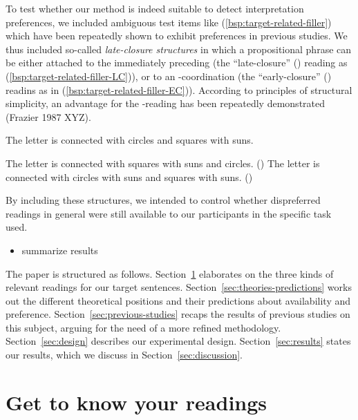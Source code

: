 \documentclass[fleqn,reqno,10pt,draft]{article}
\newcommand{\lc}{\acro{lc}}
\newcommand{\ec}{\acro{ec}}
\newcommand{\LC}{\lc}
\newcommand{\EC}{\ec}
\begin{document}
 
To test whether our method is indeed suitable to detect interpretation
preferences, we included ambiguous test items like
(\ref{bsp:target-related-filler}) which have been repeatedly shown to
exhibit preferences in previous studies. We thus included so-called
\emph{late-closure structures} in which a propositional phrase can be
either attached to the immediately preceding  (the
``late-closure'' (\LC) reading as
(\ref{bsp:target-related-filler-LC})), or to an -coordination
(the ``early-closure'' (\EC) readins as in
(\ref{bsp:target-related-filler-EC})). According to principles of
structural simplicity, an advantage for the \LC-reading has been
repeatedly demonstrated (Frazier 1987 XYZ).
\begin{exe}
\ex \label{bsp:target-related-filler} The letter is connected with circles and squares with
  suns.
  \begin{xlist}
  \ex \label{bsp:target-related-filler-LC} The letter is connected
    with squares with suns and circles. \hfill (\LC)
  \ex \label{bsp:target-related-filler-EC} The letter is connected
    with circles with suns and squares with suns. \hfill (\EC)
  \end{xlist}
\end{exe}
By including these structures, we intended to control whether
dispreferred readings in general were still available to our
participants in the specific task used.

\begin{itemize}
\item summarize results
\end{itemize}

The paper is structured as follows. Section~\ref{sec:get-know-your}
elaborates on the three kinds of relevant readings for our target
sentences. Section~\ref{sec:theories-predictions} works out the
different theoretical positions and their predictions about
availability and preference. Section~\ref{sec:previous-studies} recaps
the results of previous studies on this subject, arguing for the need
of a more refined methodology. Section~\ref{sec:design} describes our
experimental design. Section~\ref{sec:results} states our results,
which we discuss in Section~\ref{sec:discussion}.

\section{Get to know your readings}
\label{sec:get-know-your}
\end{document}

